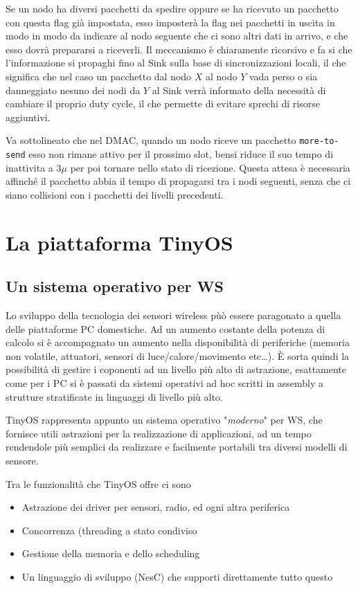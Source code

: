 \documentclass[pdftex,12pt,a4paper,italian,openany]{book}
\begin{document}
Se un nodo ha diversi pacchetti da spedire oppure se ha ricevuto un pacchetto con questa flag
già impostata, esso imposterà la flag nei pacchetti in uscita in modo in modo da indicare al 
nodo seguente che ci sono altri dati in arrivo, e che esso dovrà prepararsi a riceverli. 
Il meccanismo è chiaramente ricorsivo e fa si che l'informazione si propaghi fino al Sink 
sulla base di sincronizzazioni locali, il che significa che nel caso un pacchetto dal nodo $X$ 
al nodo $Y$ vada perso o sia danneggiato nesuno dei nodi da $Y$ al Sink verrà informato della necessità di  cambiare il proprio duty cycle, il che permette di evitare sprechi di risorse 
aggiuntivi.

Va sottolineato che nel DMAC, quando un nodo riceve un pacchetto \texttt{more-to-send} esso non 
rimane attivo per il prossimo slot, bensi riduce il suo tempo di inattivita a $3\mu$ per poi tornare nello stato di ricezione. Questa attesa è necessaria affinché il pacchetto abbia il tempo di propagarsi tra i nodi seguenti, senza che ci siano collisioni con i pacchetti dei livelli precedenti. 


\chapter{La piattaforma TinyOS}

\section{Un sistema operativo per WS}
Lo sviluppo della tecnologia dei sensori wireless pùò essere paragonato a quella delle 
piattaforme PC domestiche. Ad un aumento costante della potenza di calcolo si è accompagnato un 
aumento nella disponibilità di periferiche (memoria non volatile, attuatori, sensori di 
luce/calore/movimento etc\ldots). \`E sorta quindi la possibilità di gestire i coponenti ad un 
livello più alto di astrazione, esattamente come per i PC si è passati da sistemi operativi 
ad hoc scritti in assembly a strutture stratificate in linguaggi di livello più alto. 

TinyOS rappresenta appunto un sistema operativo "\emph{moderno}" per WS, che fornisce 
utili astrazioni per la realizzazione di applicazioni, ad un tempo rendendole più 
semplici da realizzare e facilmente portabili tra diversi modelli di sensore.

Tra le funzionalità che TinyOS offre ci sono
\begin{itemize}

\item{Astrazione dei driver per sensori, radio, ed ogni altra periferica  }

\item{Concorrenza (threading a stato condiviso}

\item{Gestione della memoria e dello scheduling}

\item{Un linguaggio di sviluppo (NesC) che supporti direttamente tutto questo}
\end{itemize}
\end{document}
